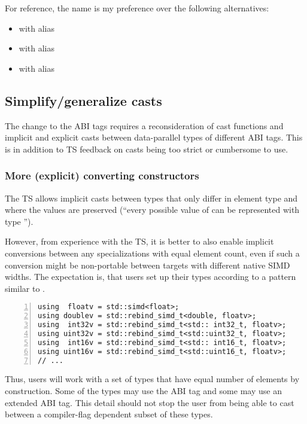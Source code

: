 For reference, the name  is my preference over the following alternatives:
\begin{itemize}
  \item {} with  alias 
  \item {} with  alias 
  \item {} with  alias 
\end{itemize}

\subsection{Simplify/generalize casts}\label{sec:casts}

The change to the ABI tags requires a reconsideration of cast functions and
implicit and explicit casts between data-parallel types of different ABI tags.
This is in addition to TS feedback on casts being too strict or cumbersome to use.

\subsubsection{More (explicit) converting constructors}

The TS allows implicit casts between  types that only
differ in element type and where the values are preserved (“every possible
value of  can be represented with type ”).

However, from experience with the TS, it is better to also enable implicit
conversions between any  specializations with equal element count,
even if such a conversion might be non-portable between targets with different
native SIMD widths.
The expectation is, that users set up their types according to a pattern
similar to .
\begin{lstlisting}[numbers=left,float={hbtp},label=lst:simdtypespattern,caption={
  Recommended setup of \code{simd} types
}]
using  floatv = std::simd<float>;
using doublev = std::rebind_simd_t<double, floatv>;
using  int32v = std::rebind_simd_t<std:: int32_t, floatv>;
using uint32v = std::rebind_simd_t<std::uint32_t, floatv>;
using  int16v = std::rebind_simd_t<std:: int16_t, floatv>;
using uint16v = std::rebind_simd_t<std::uint16_t, floatv>;
// ...
\end{lstlisting}
Thus, users will work with a set of types that have equal number of elements by
construction.
Some of the types may use the  ABI tag and some may use an
extended ABI tag.
This detail should not stop the user from being able to cast between a
compiler-flag dependent subset of these types.

